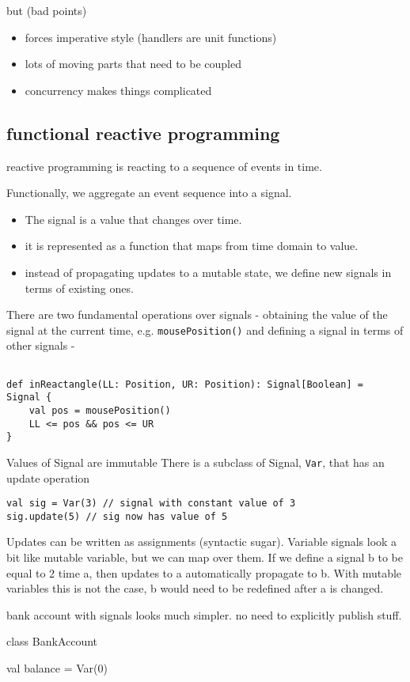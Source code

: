 \begin{lstlinsing}
but (bad points)
\begin{itemize}
	\item forces imperative style (handlers are unit functions)
	\item lots of moving parts that need to be coupled
	\item concurrency makes things complicated
\end{itemize}

\subsection{functional reactive programming}
reactive programming is reacting to a sequence of events in time.

Functionally, we aggregate an event sequence into a signal.
\begin{itemize}
	\item The signal is a value that changes over time.
	\item it is represented as a function that maps from time domain to value.
	\item instead of propagating updates to a mutable state, we define new signals in terms of existing ones.
\end{itemize}

There are two fundamental operations over signals - obtaining the value of the signal at the current time, e.g. \lstinline|mousePosition()| and defining a signal in terms of other signals -
\begin{lstlisting}

def inReactangle(LL: Position, UR: Position): Signal[Boolean] = 
Signal {
	val pos = mousePosition()
	LL <= pos && pos <= UR
}
\end{lstlisting}

Values of Signal are immutable
There is a subclass of Signal, \lstinline|Var|, that has an update operation
\begin{lstlisting}
val sig = Var(3) // signal with constant value of 3
sig.update(5) // sig now has value of 5
\end{lstlisting}

Updates can be written as assignments (syntactic sugar).
Variable signals look a bit like mutable variable, but we can map over them. If we define a signal b to be equal to 2 time a, then updates to a automatically propagate to b. With mutable variables this is not the case, b would need to be redefined after a is changed.

bank account with signals looks much simpler. no need to explicitly publish stuff.
\begin{lstlinsing}
class BankAccount {
	val balance = Var(0)
	
}
\end{lstlinsing}
\end{lstlinsing}
